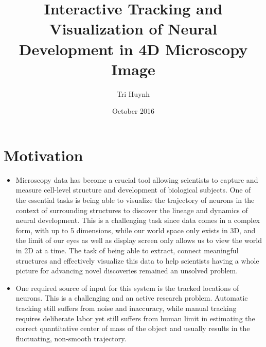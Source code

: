 \documentclass{article}
\title{Interactive Tracking and Visualization of Neural Development in 4D Microscopy Image}
\author{Tri Huynh}
\date{October 2016}
\begin{document}
\maketitle

\section{Motivation}
\begin{itemize}
    \item 
    Microscopy data has become a crucial tool allowing scientists to capture and measure cell-level structure and development of biological subjects. One of the essential tasks is being able to visualize the trajectory of neurons in the context of surrounding structures to discover the lineage and dynamics of neural development. This is a challenging task since data comes in a complex form, with up to 5 dimensions, while our world space only exists in 3D, and the limit of our eyes as well as display screen only allows us to view the world in 2D at a time. The task of being able to extract, connect meaningful structures and effectively visualize this data to help scientists having a whole picture for advancing novel discoveries remained an unsolved problem.
    \item 
    One required source of input for this system is the tracked locations of neurons. This is a challenging and an active research problem. Automatic tracking still suffers from noise and inaccuracy, while manual tracking requires deliberate labor yet still suffers from human limit in estimating the correct quantitative center of mass of the object and usually results in the fluctuating, non-smooth trajectory.
\end{itemize}
\end{document}
